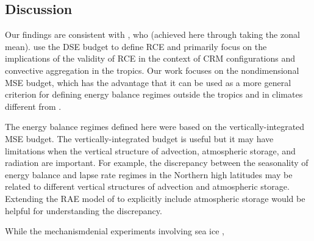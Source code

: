 \documentclass{ametsocV5}
\begin{document}
\subsection{Discussion}
Our findings are consistent with \cite{jakob2019}, who  (achieved here through taking the zonal mean). \cite{jakob2019} use the DSE budget to define RCE and primarily focus on the implications of the validity of RCE in the context of CRM configurations and convective aggregation in the tropics. Our work focuses on the nondimensional MSE budget, which has the advantage that it can be used as a more general criterion for defining energy balance regimes outside the tropics and in climates different from .

The energy balance regimes defined here were based on the vertically-integrated MSE budget. The vertically-integrated budget is useful but it may have limitations when the vertical structure of advection, atmospheric storage, and radiation are important. For example, the discrepancy between the seasonality of energy balance and lapse rate regimes in the Northern high latitudes may be related to different vertical structures of advection and atmospheric storage. Extending the RAE model of \cite{cronin2016} to explicitly include atmospheric storage would be helpful for understanding the discrepancy. 

While the mechanism\replaced{-}{ }denial experiments involving sea ice ,
\end{document}
